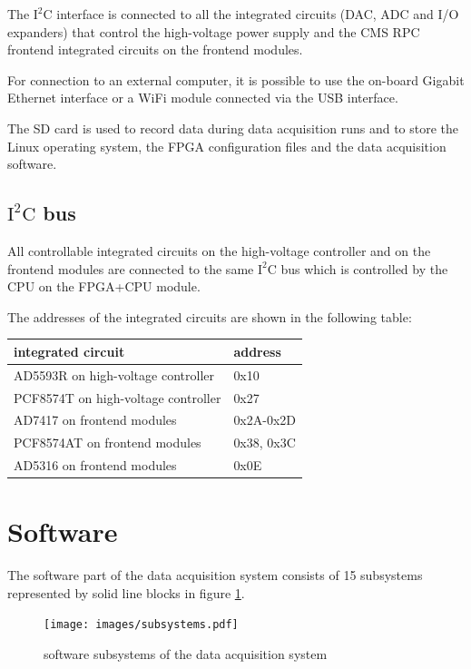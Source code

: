 \documentclass[12pt, a4paper]{article}
\begin{document}
The $\text{I}^\text{2}\text{C}$ interface is connected to all the integrated circuits (DAC, ADC and I/O expanders) that control the high-voltage power supply and the CMS RPC frontend integrated circuits on the frontend modules.

For connection to an external computer, it is possible to use the on-board Gigabit Ethernet interface or a WiFi module connected via the USB interface.

The SD card is used to record data during data acquisition runs and to store the Linux operating system, the FPGA configuration files and the data acquisition software.

\subsection{$\text{I}^\text{2}\text{C}$ bus}

All controllable integrated circuits on the high-voltage controller and on the frontend modules are connected to the same $\text{I}^\text{2}\text{C}$ bus which is controlled by the CPU on the FPGA+CPU module.

The addresses of the integrated circuits are shown in the following table:
\begin{center}
  \begin{tabular}{|l|l|}
  \hline
  \textbf{integrated circuit} & \textbf{address} \\
  \hline
  AD5593R on high-voltage controller & 0x10 \\
  \hline
  PCF8574T on high-voltage controller & 0x27 \\
  \hline
  AD7417 on frontend modules & 0x2A-0x2D \\
  \hline
  PCF8574AT on frontend modules & 0x38, 0x3C \\
  \hline
  AD5316 on frontend modules & 0x0E \\
  \hline
  \end{tabular}
\end{center}

\section{Software}

The software part of the data acquisition system consists of 15 subsystems represented by solid line blocks in figure \ref{fig:subsystems}.

\begin{figure}[h!]
  \centering
  \texttt{[image: images/subsystems.pdf]}
  \caption{software subsystems of the data acquisition system}
  \label{fig:subsystems}
\end{figure}
\end{document}
